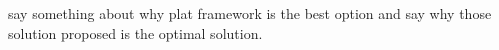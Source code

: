 say something about why plat framework is the best option and say why those solution proposed is the optimal solution. 